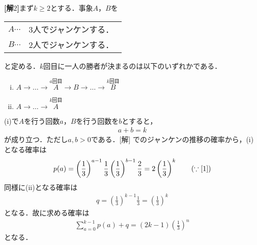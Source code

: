 \documentclass[a4j]{jarticle}
\begin{document}
\begin{multicols}{2}
{\bf[解$2$]}まず$k\ge2$とする．事象$A$，$B$を
     \begin{center}
          \begin{tabular}{ll}
          $A\cdots$ & $3$人でジャンケンする．　\\
          $B\cdots$ & $2$人でジャンケンする．
          \end{tabular}
     \end{center}
と定める．$k$回目に一人の勝者が決まるのは以下のいずれかである．
     \begin{enumerate}[(i)]
     \item $A\to \dots\to \stackrel{a回目}{A}\to B\to \dots \to \stackrel{k回目}{B}$
     \item $A\to\dots\to \stackrel{k回目}{A}$
     \end{enumerate}
(i)で$A$を行う回数$a$，$B$を行う回数を$b$とすると，
     \begin{align}
     a+b=k\label{1}
     \end{align}      
が成り立つ．ただし$a,b>0$である．[解] でのジャンケンの推移の確率から，(i)となる確率は
     \begin{align*}
     p(a)=\left(\frac{1}{3}\right)^{a-1}\frac{1}{3}\left(\frac{1}{3}\right)^{b-1}\frac{2}{3}%
     =2\left(\frac{1}{3}\right)^k\tag{$\because\eqref{1}$}
     \end{align*}   
同様に(ii)となる確率は
     \begin{align*}
      q=\left(\frac{1}{3}\right)^{k-1}\frac{1}{3}=\left(\frac{1}{3}\right)^k
      \end{align*}
 となる．故に求める確率は
      \begin{align*}
      \sum_{a=0}^{k-1}p(a)+q=(2k-1)\left(\frac{1}{3}\right)^n\tag{答}
      \end{align*}
 となる．     
\newpage
\end{multicols}
\end{document}

